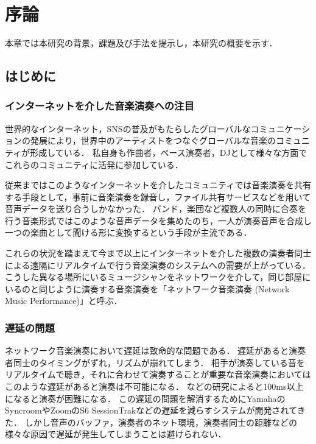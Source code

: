 \chapter{序論}
\label{introduction}

本章では本研究の背景，課題及び手法を提示し，本研究の概要を示す．

\section{はじめに}
\label{introduction:background}

\subsection{インターネットを介した音楽演奏への注目}
世界的なインターネット，SNSの普及がもたらしたグローバルなコミュニケーションの発展により，世界中のアーティストをつなぐグローバルな音楽のコミュニティが形成している．
私自身も作曲者，ベース演奏者，DJとして様々な方面でこれらのコミュニティに活発に参加している．

従来まではこのようなインターネットを介したコミュニティでは音楽演奏を共有する手段として，事前に音楽演奏を録音し，ファイル共有サービスなどを用いて音声データを送り合うしかなかった．
バンド，楽団など複数人の同時に合奏を行う音楽形式ではこのような音声データを集めたのち，一人が演奏音声を合成し一つの楽曲として聞ける形に変換するという手段が主流である．


これらの状況を踏まえて今まで以上にインターネットを介した複数の演奏者同士による遠隔にリアルタイムで行う音楽演奏のシステムへの需要が上がっている．
こうした異なる場所にいるミュージシャンをネットワークを介して，同じ部屋にいるのと同じように演奏する音楽演奏を「ネットワーク音楽演奏 (Network Music Performance)\cite{lazzaro}」と呼ぶ．

\subsection{遅延の問題}
ネットワーク音楽演奏において遅延は致命的な問題である．
遅延があると演奏者同士のタイミングがずれ，リズムが崩れてしまう．
相手が演奏している音をリアルタイムで聴き，それに合わせて演奏することが重要な音楽演奏においてはこのような遅延があると演奏は不可能になる．
\cite{latency:effect}などの研究によると100ms以上になると演奏が困難になる．
この遅延の問題を解消するためにYamahaのSyncroom\cite{syncroom}やZoomのS6 SessionTrakなどの遅延を減らすシステムが開発されてきた．
しかし音声のバッファ，演奏者のネット環境，演奏者同士の距離などの様々な原因で遅延が発生してしまうことは避けられない．

